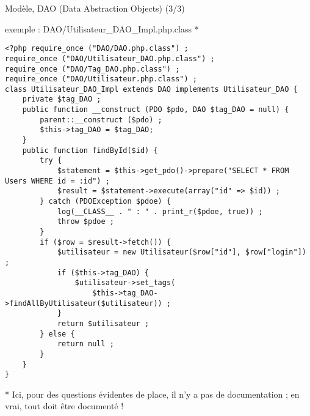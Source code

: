 \begin{frame}[containsverbatim]{Modèle, DAO (Data Abstraction Objects) (3/3)}
	\begin{block}{exemple : DAO/Utilisateur\_DAO\_Impl.php.class *}
		\begin{lstlisting}
<?php require_once ("DAO/DAO.php.class") ;
require_once ("DAO/Utilisateur_DAO.php.class") ;
require_once ("DAO/Tag_DAO.php.class") ;
require_once ("DAO/Utilisateur.php.class") ;
class Utilisateur_DAO_Impl extends DAO implements Utilisateur_DAO {
	private $tag_DAO ;
	public function __construct (PDO $pdo, DAO $tag_DAO = null) {
		parent::__construct ($pdo) ;
		$this->tag_DAO = $tag_DAO;
	}
	public function findById($id) {
		try {
			$statement = $this->get_pdo()->prepare("SELECT * FROM Users WHERE id = :id") ;
			$result = $statement->execute(array("id" => $id)) ;
		} catch (PDOException $pdoe) {
			log(__CLASS__ . " : " . print_r($pdoe, true)) ;
			throw $pdoe ;
		}
		if ($row = $result->fetch()) {
			$utilisateur = new Utilisateur($row["id"], $row["login"]) ;
			if ($this->tag_DAO) {
				$utilisateur->set_tags(
					$this->tag_DAO->findAllByUtilisateur($utilisateur)) ;
			}
			return $utilisateur ;
		} else {
			return null ;
		}
	}
}
		\end{lstlisting}
	\end{block}
	* Ici, pour des questions évidentes de place, il n'y a pas de documentation ; en vrai, tout doit être documenté !
\end{frame}

